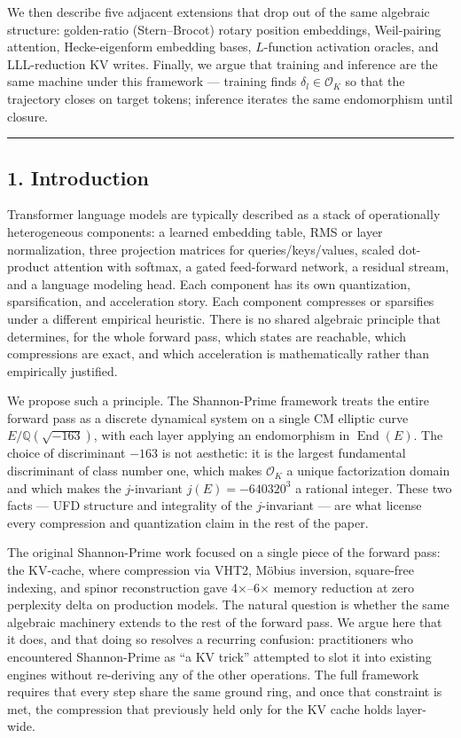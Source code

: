 \documentclass[
  11pt,
]{article}
\begin{document}
We then describe five adjacent extensions that drop out of the same
algebraic structure: golden-ratio (Stern--Brocot) rotary position
embeddings, Weil-pairing attention, Hecke-eigenform embedding bases,
\(L\)-function activation oracles, and LLL-reduction KV writes. Finally,
we argue that training and inference are the same machine under this
framework --- training finds \(\delta_l \in \mathcal{O}_K\) so that the
trajectory closes on target tokens; inference iterates the same
endomorphism until closure.

\begin{center}\rule{0.5\linewidth}{0.5pt}\end{center}

\hypertarget{introduction}{%
\subsection{1. Introduction}\label{introduction}}

Transformer language models are typically described as a stack of
operationally heterogeneous components: a learned embedding table, RMS
or layer normalization, three projection matrices for
queries/keys/values, scaled dot-product attention with softmax, a gated
feed-forward network, a residual stream, and a language modeling head.
Each component has its own quantization, sparsification, and
acceleration story. Each component compresses or sparsifies under a
different empirical heuristic. There is no shared algebraic principle
that determines, for the whole forward pass, which states are reachable,
which compressions are exact, and which acceleration is mathematically
rather than empirically justified.

We propose such a principle. The Shannon-Prime framework treats the
entire forward pass as a discrete dynamical system on a single CM
elliptic curve \(E / \mathbb{Q}(\sqrt{-163})\), with each layer applying
an endomorphism in \(\operatorname{End}(E)\). The choice of discriminant
\(-163\) is not aesthetic: it is the largest fundamental discriminant of
class number one, which makes \(\mathcal{O}_K\) a unique factorization
domain and which makes the \(j\)-invariant \(j(E) = -640320^3\) a
rational integer. These two facts --- UFD structure and integrality of
the \(j\)-invariant --- are what license every compression and
quantization claim in the rest of the paper.

The original Shannon-Prime work focused on a single piece of the forward
pass: the KV-cache, where compression via VHT2, Möbius inversion,
square-free indexing, and spinor reconstruction gave 4×--6× memory
reduction at zero perplexity delta on production models. The natural
question is whether the same algebraic machinery extends to the rest of
the forward pass. We argue here that it does, and that doing so resolves
a recurring confusion: practitioners who encountered Shannon-Prime as
``a KV trick'' attempted to slot it into existing engines without
re-deriving any of the other operations. The full framework requires
that every step share the same ground ring, and once that constraint is
met, the compression that previously held only for the KV cache holds
layer-wide.
\end{document}
